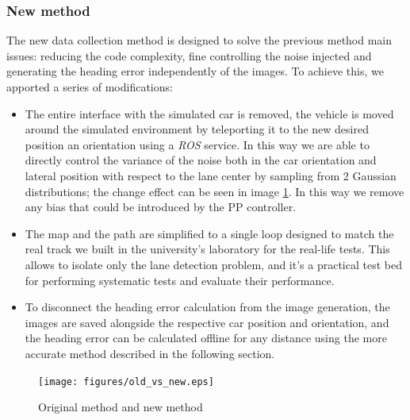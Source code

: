 \documentclass[a4paper,12pt,sort&compress]{article}
\begin{document}
\subsubsection*{New method}
The new data collection method is designed to solve the previous method main issues: reducing the
code complexity, fine controlling the noise injected and generating the heading error independently of
the images. To achieve this, we apported a series of modifications:
\begin{itemize}
    \item The entire interface with the simulated car is removed, the vehicle is moved around the
    simulated environment by teleporting it to the new desired position an orientation using a
    \textit{ROS} service. In this way we are able to directly control the variance of the noise both
    in the car orientation and lateral position with respect to the lane center by sampling from 2
    Gaussian distributions; the change effect can be seen in image \ref{fig:original_vs_old}. In
    this way we remove any bias that could be introduced by the PP controller. 
    \item The map and the path are simplified to a single loop designed to match the real track we
    built in the university's laboratory for the real-life tests. This allows to isolate only the
    lane detection problem, and it's a practical test bed for performing systematic tests and
    evaluate their performance. 
    \item To disconnect the heading error calculation from the image generation, the images are
    saved alongside the respective car position and orientation, and the heading error can be
    calculated offline for any distance using the more accurate method described in the following
    section.   
\end{itemize}


\begin{figure}
    \centering
    \texttt{[image: figures/old\_vs\_new.eps]}
    \caption{Original method and new method}
    \label{fig:original_vs_old}
\end{figure}

\end{document}
